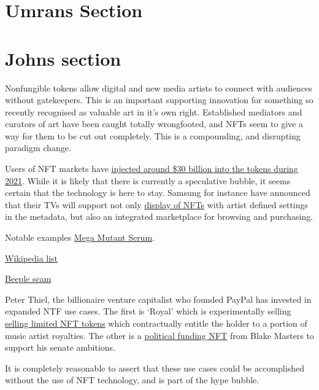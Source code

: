 \section{Umrans Section}


\section{Johns section}
Nonfungible tokens allow digital and new media artists to connect with audiences without gatekeepers. This is an important supporting innovation for something so recently recognised as valuable art in it's own right. Established mediators and curators of art have been caught totally wrongfooted, and NFTs seem to give a way for them to be cut out completely. This is a compounding, and disrupting paradigm change.\par

Users of NFT markets have \href{https://blog.chainalysis.com/reports/nft-market-report-preview-2021/}{injected around \$30 billion into the tokens during 2021}. While it is likely that there is currently a speculative bubble, it seems certain that the technology is here to stay. Samsung for instance have announced that their TVs will support not only \href{https://news.samsung.com/us/samsung-2022-micro-led-neo-qled-lifestyle-tvs-personalization-options-ces-2022/}{display of NFTs} with artist defined settings in the metadata, but also an integrated marketplace for browsing and purchasing.

Notable examples
\href{https://opensea.io/assets/0x22c36bfdcef207f9c0cc941936eff94d4246d14a/69}{Mega Mutant Serum}.

\href{https://en.wikipedia.org/wiki/List_of_most_expensive_non-fungible_tokens}{Wikipedia list}

\href{https://amycastor.com/2021/03/14/metakovan-the-mystery-beeple-art-buyer-and-his-nft-defi-scheme/}{Beeple scam}


Peter Thiel, the billionaire venture capitalist who founded PayPal has invested in expanded NTF use cases. The first is `Royal' which is experimentally  selling \href{https://royal.io/}{selling limited NFT tokens} which contractually entitle the holder to a portion of music artist royalties. The other is a \href{https://www.ztonft.com/}{political funding NFT} from Blake Masters to support his senate ambitions.

It is completely reasonable to assert that these use cases could be accomplished without the use of NFT technology, and is part of the hype bubble.

